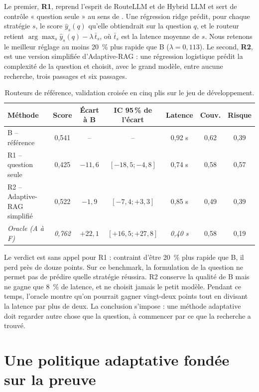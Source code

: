 \documentclass[11pt,a4paper]{article}
\begin{document}
Le premier, \textbf{R1}, reprend l'esprit de RouteLLM et de Hybrid LLM et sert de contrôle « question
seule » au sens de \citet{li2026beyond}. Une régression ridge prédit, pour chaque stratégie $s$, le score
$\hat{y}_s(q)$ qu'elle obtiendrait sur la question $q$, et le routeur retient
$\arg\max_s \hat{y}_s(q) - \lambda\,\bar{t}_s$, où $\bar{t}_s$ est la latence moyenne de $s$. Nous
retenons le meilleur réglage au moins 20~\% plus rapide que B ($\lambda = 0{,}113$). Le second,
\textbf{R2}, est une version simplifiée d'Adaptive-RAG \citep{jeong2024adaptiverag} : une régression
logistique prédit la complexité de la question et choisit, avec le grand modèle, entre aucune recherche,
trois passages et six passages.

\begin{table}[H]
\centering\small
\begin{tabular}{l c c c c c c}
\toprule
\textbf{Méthode} & \textbf{Score} & \textbf{Écart à B} & \textbf{IC 95\,\% de l'écart} & \textbf{Latence} & \textbf{Couv.} & \textbf{Risque} \\
\midrule
B -- référence & 0,541 & -- & -- & 0,92 s & 0,62 & 0,39 \\
R1 -- question seule & 0,425 & $-11{,}6$ & $[-18{,}5 ; -4{,}8]$ & 0,74 s & 0,58 & 0,57 \\
R2 -- Adaptive-RAG simplifié & 0,522 & $-1{,}9$ & $[-7{,}4 ; +3{,}3]$ & 0,85 s & 0,49 & 0,39 \\
\textit{Oracle (A à F)} & \textit{0,762} & $+22{,}1$ & $[+16{,}5 ; +27{,}8]$ & \textit{0,40 s} & 0,58 & 0,19 \\
\bottomrule
\end{tabular}
\caption{Routeurs de référence, validation croisée en cinq plis sur le jeu de développement.}
\label{tab:routeurs}
\end{table}

Le verdict est sans appel pour R1 : contraint d'être 20~\% plus rapide que B, il perd près de douze
points. Sur ce benchmark, la formulation de la question ne permet pas de prédire quelle stratégie
réussira. R2 conserve la qualité de B mais ne gagne que 8~\% de latence, et ne choisit jamais le petit
modèle. Pendant ce temps, l'oracle montre qu'on pourrait gagner vingt-deux points tout en divisant la
latence par plus de deux. La conclusion s'impose : une méthode adaptative doit regarder autre chose que
la question, à commencer par ce que la recherche a trouvé.

\section{Une politique adaptative fondée sur la preuve}\label{sec:politique}
\end{document}
